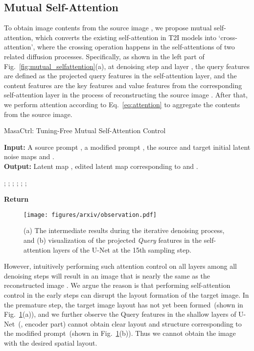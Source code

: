 \documentclass[10pt,twocolumn,letterpaper]{article}
\begin{document}
\subsection{Mutual Self-Attention} \label{sec:mutual-self-attention}
To obtain image contents from the source image , we propose mutual self-attention, which converts the existing self-attention in T2I models into `cross-attention', where the crossing operation happens in the self-attentions of two related diffusion processes.
Specifically, as shown in the left part of Fig.~\ref{fig:mutual_selfattention}(a), at denoising step  and layer , the query features are defined as the projected query features  in the self-attention layer, and the content features are the key features  and value features  from the corresponding self-attention layer in the process of reconstructing the source image . After that, we perform attention according to Eq.~\ref{eq:attention} to aggregate the contents from the source image. 


\begin{algorithm}[!t]    
    \caption{MasaCtrl: Tuning-Free Mutual Self-Attention Control}
\textbf{Input:} A source prompt , a modified prompt , the source and target initial latent noise maps  and . \\
        \textbf{Output:} Latent map , edited latent map  corresponding to  and .
        \begin{algorithmic}[1]
            \FOR{}
                \STATE ;
                \STATE ;
                \STATE ;
                \STATE ;
                \STATE ;
                \STATE ;
            \ENDFOR
        \end{algorithmic}
        \label{alg:masactrl}
        \textbf{Return} 
\end{algorithm}


\begin{figure}[th]
    \centering
    \texttt{[image: figures/arxiv/observation.pdf]}
    \caption{(a) The intermediate results during the iterative denoising process, and (b) visualization of the projected \textit{Query} features  in the self-attention layers of the U-Net at the 15th sampling step.}
    \label{fig:intermediate_vis}
\end{figure}


However, intuitively performing such attention control on all layers among all denoising steps will result in an image  that is nearly the same as the reconstructed image . We argue the reason is that performing self-attention control in the early steps can disrupt the layout formation of the target image. In the premature step, the target image layout has not yet been formed~(shown in Fig.~\ref{fig:intermediate_vis}(a)), and we further observe the Query features in the shallow layers of U-Net~(\eg, encoder part) cannot obtain clear layout and structure corresponding to the modified prompt~(shown in Fig.~\ref{fig:intermediate_vis}(b)). Thus we cannot obtain the image with the desired spatial layout.
\end{document}
